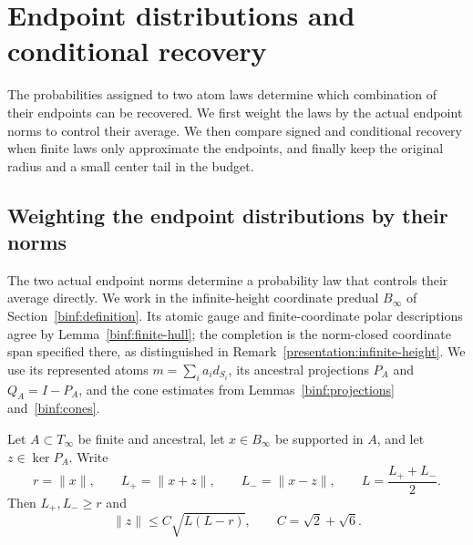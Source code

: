 \section{Endpoint distributions and conditional recovery}

The probabilities assigned to two atom laws determine which combination
of their endpoints can be recovered. We first weight the laws by the
actual endpoint norms to control their average. We then compare signed
and conditional recovery when finite laws only approximate the endpoints,
and finally keep the original radius and a small center tail in the
budget.

\subsection{Weighting the endpoint distributions by their norms}
\label{molw:sec}

The two actual endpoint norms determine a probability law that controls
their average directly. We work in the infinite-height coordinate
predual $B_\infty$ of Section~\ref{binf:definition}. Its atomic gauge
and finite-coordinate polar descriptions agree by
Lemma~\ref{binf:finite-hull}; the completion is the norm-closed coordinate span
specified there, as distinguished in Remark~\ref{presentation:infinite-height}.
We use its represented atoms $m=\sum_i a_i d_{S_i}$, its ancestral
projections $P_A$ and $Q_A=I-P_A$, and the cone estimates from
Lemmas~\ref{binf:projections} and~\ref{binf:cones}.

\begin{theorem}\label{molw:average}
Let $A\subset T_\infty$ be finite and ancestral, let
$x\in B_\infty$ be supported in $A$, and let $z\in\ker P_A$. Write
\[
 r=\|x\|,\qquad L_+=\|x+z\|,\qquad L_-=\|x-z\|,
 \qquad L=\frac{L_++L_-}{2}.
\]
Then $L_+,L_-\ge r$ and
\begin{equation}\label{molw:lens}
 \|z\|\le C\sqrt{L(L-r)},\qquad C=\sqrt2+\sqrt6.
\end{equation}
\end{theorem}

